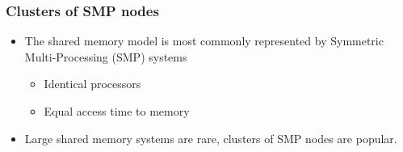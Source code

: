 \documentclass[9pt,c]{beamer}
\begin{document}
\begin{frame}
  \frametitle{Clusters of SMP nodes}
  \begin{itemize}
    \item The shared memory model is most commonly represented by Symmetric Multi-Processing (SMP) systems
    \begin{itemize}
      \item Identical processors
      \item Equal access time to memory
    \end{itemize}
    \item Large shared memory systems are rare, clusters of SMP nodes are popular.
  \end{itemize}

  
\end{frame}
\end{document}
